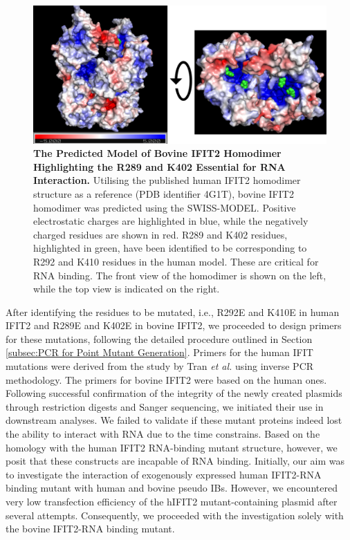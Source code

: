 \begin{figure}
    \centering
    \includegraphics[width=1\linewidth]{09. Chapter 4/Figs/01. pIB/03. IFIT2/05. IFIT2-RNA binding mutant/01. Structure/01. structure.png}
    \caption[The Predicted Model of Bovine IFIT2 Homodimer Highlighting the R289 and K402 Essential for RNA Interaction.]{\textbf{The Predicted Model of Bovine IFIT2 Homodimer Highlighting the R289 and K402 Essential for RNA Interaction.} Utilising the published human IFIT2 homodimer structure as a reference (PDB identifier 4G1T), bovine IFIT2 homodimer was predicted using the SWISS-MODEL. Positive electrostatic charges are highlighted in blue, while the negatively charged residues are shown in red. R289 and K402 residues, highlighted in green, have been identified to be corresponding to R292 and K410 residues in the human model. These are critical for RNA binding. The front view of the homodimer is shown on the left, while the top view is indicated on the right.}
    \label{fig:ifit2 mutant structure}
\end{figure}

After identifying the residues to be mutated, i.e., R292E and K410E in human IFIT2 and R289E and K402E in bovine IFIT2, we proceeded to design primers for these mutations, following the detailed procedure outlined in Section \ref{subsec:PCR for Point Mutant Generation}. Primers for the human IFIT mutations were derived from the study by Tran \textit{et al.} \cite{Tran2020InfluenzaMRNAs} using inverse PCR methodology. The primers for bovine IFIT2 were based on the human ones. Following successful confirmation of the integrity of the newly created plasmids through restriction digests and Sanger sequencing, we initiated their use in downstream analyses. We failed to validate if these mutant proteins indeed lost the ability to interact with RNA due to the time constrains. Based on the homology with the human IFIT2 RNA-binding mutant structure, however, we posit that these constructs are incapable of RNA binding. Initially, our aim was to investigate the interaction of exogenously expressed human IFIT2-RNA binding mutant with human and bovine pseudo IBs. However, we encountered very low transfection efficiency of the hIFIT2 mutant-containing plasmid after several attempts. Consequently, we proceeded with the investigation solely with the bovine IFIT2-RNA binding mutant.

